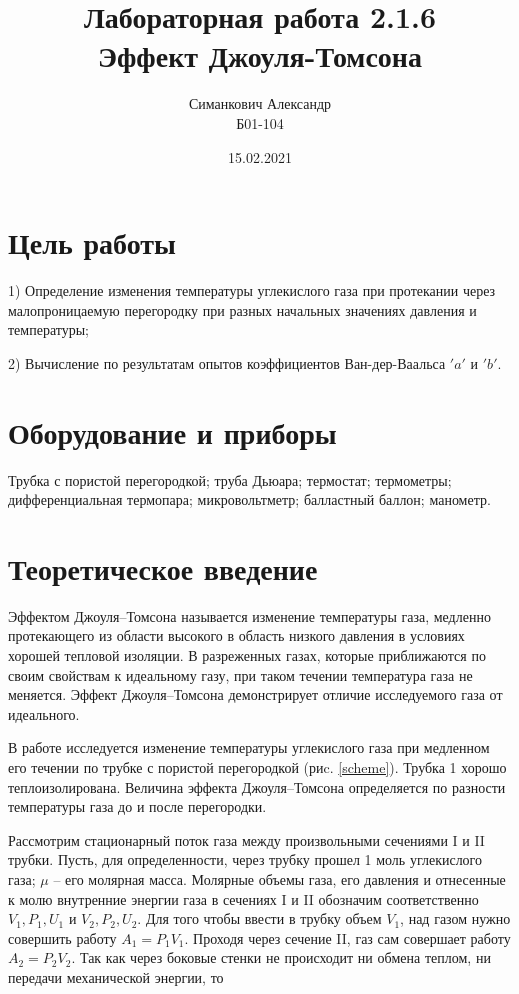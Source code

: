 \documentclass[a4paper, 12pt]{article}
\title{Лабораторная работа 2.1.6\\ Эффект Джоуля-Томсона}
\author{Симанкович Александр \\ Б01-104}
\date{15.02.2021}
\begin{document}
	\maketitle
	
	\section*{Цель работы} 
	1) Определение изменения температуры углекислого газа при протекании через малопроницаемую перегородку при разных начальных значениях давления и температуры;
	
	2) Вычисление по результатам опытов коэффициентов Ван-дер-Ваальса $'a'$ и $'b'$.
	
	\section*{Оборудование и приборы} Трубка с пористой перегородкой; труба Дьюара; термостат; термометры; дифференциальная термопара; микровольтметр; балластный баллон; манометр.
	
\section*{Теоретическое введение}
Эффектом Джоуля–Томсона называется изменение температуры газа, медленно протекающего из области высокого в область низкого давления в условиях хорошей тепловой изоляции. В разреженных газах, которые приближаются по своим свойствам к идеальному газу, при таком течении температура газа не меняется. Эффект Джоуля–Томсона демонстрирует отличие исследуемого газа от идеального.

В работе исследуется изменение температуры углекислого газа при медленном его течении по трубке с пористой перегородкой (риc. \ref{scheme}). Трубка 1 хорошо теплоизолирована. Величина эффекта Джоуля–Томсона определяется по разности температуры газа до и после перегородки.

Рассмотрим стационарный поток газа между произвольными сечениями I и II трубки. Пусть, для определенности, через трубку прошел 1 моль углекислого газа; $ \mu $ -- его молярная масса. Молярные объемы газа, его давления и отнесенные к молю внутренние энергии газа в сечениях I и II обозначим соответственно $ V_1, P_1, U_1 $ и $ V_2, P_2, U_2 $. Для того чтобы ввести в трубку объем $ V_1 $, над газом нужно совершить работу $ A_1 = P_1V_1 $. Проходя через сечение II, газ сам совершает работу $ A_2 = P_2V_2 $. Так как через боковые стенки не происходит ни обмена теплом, ни передачи механической энергии, то
\end{document}
